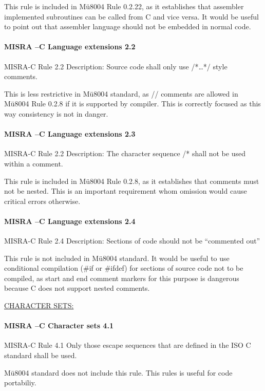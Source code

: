 This rule is included in Mü8004 Rule 0.2.22, as it establishes that assembler implemented subroutines can be called from C and vice versa. It would be useful to point out that assembler language should not be embedded in normal code.

\paragraph{MISRA –C Language extensions 2.2}
MISRA-C Rule 2.2 Description: Source code shall only use /*…*/ style comments.

This is less restrictive in Mü8004 standard, as // comments are allowed in Mü8004 Rule 0.2.8 if it is supported by compiler. This is correctly focused as this way consistency is not in danger.

\paragraph{MISRA –C Language extensions 2.3}
MISRA-C Rule 2.2 Description: The character sequence /* shall not be used within a comment.

This rule is included in Mü8004 Rule 0.2.8, as it establishes that comments must not be nested. This is an important requirement whom omission would cause critical errors otherwise.

\paragraph{MISRA –C Language extensions 2.4}
MISRA-C Rule 2.4 Description: Sections of code should not be “commented out”

This rule is not included in Mü8004 standard. It would be useful to use conditional compilation (\#if or \#ifdef) for sections of source code not to be compiled, as start and end comment markers for this purpose is dangerous because C does not support nested comments.

\begin{center}
\textsc{\underline{CHARACTER SETS:}}
\end{center}

\paragraph{MISRA –C Character sets 4.1}
MISRA-C Rule 4.1 Only those escape sequences that are defined in the ISO C
standard shall be used.

Mü8004 standard does not include this rule. This rules is useful for code portabiliy.
 
